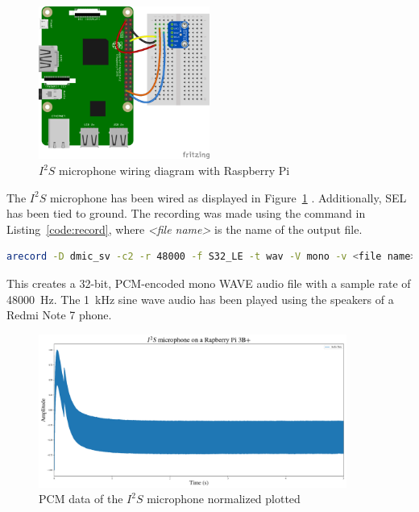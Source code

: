 \begin{figure}[H]
    \centering
    \includegraphics[width=0.5\textwidth]{figures/i2s/wiring_pi.png}
    \caption[$I^2S$ microphone wiring diagram with Raspberry Pi \cite{i2s_wiring}]{$I^2S$ microphone wiring diagram with Raspberry Pi}
    \label{fig:i2s_wiring}
\end{figure}

The $I^2S$ microphone has been wired as displayed in Figure~\ref{fig:i2s_wiring} \cite{i2s_wiring}.
Additionally, SEL has been tied to ground.
The recording was made using the command in Listing~\ref{code:record},
where \emph{<file name>} is the name of the output file.

\begin{minipage}{\textwidth}
\begin{lstlisting}[style=colorEX,language=bash,caption={Recording Command},label={code:record}]
arecord -D dmic_sv -c2 -r 48000 -f S32_LE -t wav -V mono -v <file name>
\end{lstlisting}
\end{minipage}

This creates a 32-bit, PCM-encoded mono WAVE audio file with a sample rate of \SI{48000}{\hertz}.
The \SI{1}{\kilo\hertz} sine wave audio has been played using the speakers of a Redmi Note 7 phone.

\begin{figure}[H]
    \centering
    \includegraphics[width=0.9\textwidth]{figures/i2s/i2s_raw_data.png}
    \caption[PCM data of the $I^2S$ microphone normalized and plotted]{PCM data of the $I^2S$ microphone normalized plotted}
    \label{fig:i2s_raw}
\end{figure}


